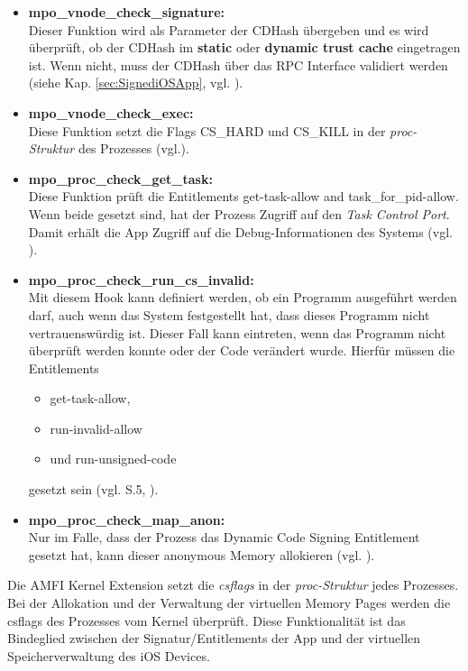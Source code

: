 \begin{itemize}
    \item \label{item:AMFIfunc} \textbf{mpo\_vnode\_check\_signature:} \\
    Dieser Funktion wird als Parameter der CDHash übergeben und es wird überprüft, ob der CDHash im \textbf{static} oder \textbf{dynamic trust cache} eingetragen ist. Wenn nicht, muss der CDHash über das RPC Interface validiert werden (siehe Kap. \ref{sec:SignediOSApp}, vgl. \cite{iOSSec[5], Hacking[1]}).
    \item \textbf{mpo\_vnode\_check\_exec:}\\
    Diese Funktion setzt die Flags CS\_HARD und CS\_KILL in der \textit{\glqq proc-Struktur\grqq{}} des Prozesses (vgl.\cite{iOSSec[5],  Hacking[1]}).
    \item \textbf{mpo\_proc\_check\_get\_task:}\\
    Diese Funktion prüft die Entitlements get-task-allow and task\_for\_pid-allow. Wenn beide gesetzt sind, hat der Prozess Zugriff auf den \textit{\glqq Task Control Port\grqq{}}. Damit erhält  die App Zugriff auf die Debug-Informationen des Systems (vgl. \cite{iOSSec[5],  Hacking[1]}).
    
    \item \textbf{mpo\_proc\_check\_run\_cs\_invalid:} \\
    Mit diesem Hook kann definiert werden, ob ein Programm ausgeführt werden darf, auch wenn das System festgestellt hat, dass dieses Programm nicht vertrauenswürdig ist. Dieser Fall kann eintreten, wenn das Programm nicht überprüft werden konnte oder der Code verändert wurde. Hierfür müssen die Entitlements 
    \begin{itemize}
        \item get-task-allow, 
        \item run-invalid-allow 
        \item und run-unsigned-code 
     \end{itemize} 
     gesetzt sein (vgl. \cite{iOSSec[5]} S.5, \cite{Hacking[1]}).
    
    \item \textbf{mpo\_proc\_check\_map\_anon:}\\
    Nur im Falle, dass der Prozess das Dynamic Code Signing Entitlement gesetzt hat, kann dieser anonymous Memory allokieren (vgl. \cite{iOSSec[5],  Hacking[1]}).
\end{itemize}

Die AMFI Kernel Extension setzt die \textit{\glqq csflags\grqq{}} in der \textit{\glqq proc-Struktur\grqq{}} jedes Prozesses. Bei der Allokation und der Verwaltung der virtuellen Memory Pages werden die csflags des Prozesses vom Kernel überprüft. Diese Funktionalität ist das Bindeglied zwischen der Signatur/Entitlements der App und der virtuellen Speicherverwaltung des iOS Devices. 

